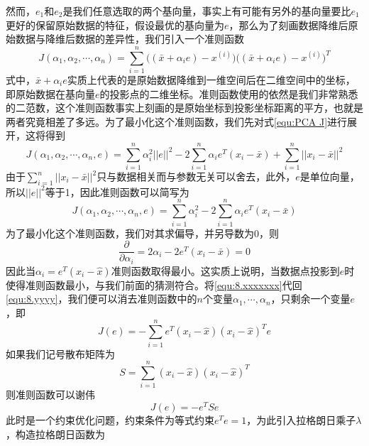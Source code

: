 然而，$e_1$和$e_2$是我们任意选取的两个基向量，事实上有可能有另外的基向量要比$e_1$更好的保留原始数据的特征，假设最优的基向量为$e$，那么为了刻画数据降维后原始数据与降维后数据的差异性，我们引入一个准则函数
\begin{equation}
J(\alpha_1, \alpha_2, \cdots, \alpha_n) = \sum\limits_{i=1}^n \bigg((\bar{x}+\alpha_i e) - x^{(i)}\bigg)\bigg((\bar{x}+\alpha_i e) - x^{(i)}\bigg)^T
\label{equ:PCA J}
\end{equation}
式中，$\bar{x}+\alpha_i e$实质上代表的是原始数据降维到一维空间后在二维空间中的坐标，即原始数据在基向量$e$的投影点的二维坐标。准则函数使用的依然是我们非常熟悉的二范数，这个准则函数事实上刻画的是原始坐标到投影坐标距离的平方，也就是两者究竟相差了多远。为了最小化这个准则函数，我们先对式\eqref{equ:PCA J}进行展开，这将得到
\begin{equation}
J(\alpha_1, \alpha_2, \cdots, \alpha_n, e) = \sum\limits_{i=1}^n \alpha_i^2 ||e||^2 - 2\sum\limits_{i=1}^n \alpha_i e^T(x_i - \bar{x}) + \sum\limits_{i=1}^n ||x_i - \bar{x}||^2
\end{equation}
由于$\sum_{i=1}^n ||x_i - \bar{x}||^2$只与数据相关而与参数无关可以舍去，此外，$e$是单位向量，所以$||e||^2$等于1，因此准则函数可以简写为
\begin{equation}
J(\alpha_1, \alpha_2, \cdots, \alpha_n, e) = \sum\limits_{i=1}^n \alpha_i^2  - 2\sum\limits_{i=1}^n \alpha_i e^T(x_i - \bar{x})
\label{equ:8.yyyy}
\end{equation}
为了最小化这个准则函数，我们对其求偏导，并另导数为0，则
\begin{equation}
\frac{\partial}{\partial \alpha_i} = 2\alpha_i - 2e^T(x_i - \bar{x}) = 0
\label{equ:8.xxxxxxx}
\end{equation}
因此当$\alpha_i = e^T(x_i - \hat{x})$准则函数取得最小。这实质上说明，当数据点投影到$e$时使得准则函数最小，与我们前面的猜测符合。将\eqref{equ:8.xxxxxxx}代回\eqref{equ:8.yyyy}，我们便可以消去准则函数中的$n$个变量$\alpha_1, \cdots, \alpha_n$，只剩余一个变量$e$，即
\begin{equation}
J(e) = - \sum\limits_{i=1}^n e^T(x_i - \hat{x})(x_i - \hat{x})^Te
\end{equation}
如果我们记号散布矩阵为
\begin{equation}
S =\sum\limits_{i=1}^n (x_i - \hat{x})(x_i - \hat{x})^T
\end{equation}
则准则函数可以谢伟
\begin{equation}
J(e) =  -  e^TSe
\end{equation}
此时是一个约束优化问题，约束条件为等式约束$e^Te = 1$，为此引入拉格朗日乘子$\lambda$，构造拉格朗日函数为
